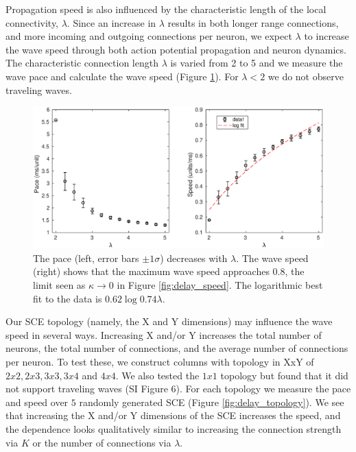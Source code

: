 Propagation speed is also influenced by the characteristic length of the local connectivity, $\lambda$.
Since an increase in $\lambda$ results in both longer range connections, and more incoming and outgoing connections per neuron, we expect $\lambda$ to increase the wave speed through both action potential propagation and neuron dynamics.
The characteristic connection length $\lambda$ is varied from 2 to 5 and we measure the wave pace and calculate the wave speed (Figure \ref{fig:delay_lambda}).
For $\lambda<2$  we do not observe traveling waves.
\begin{figure}[!htb]
 \centering
   \includegraphics[width=\textwidth]{fig/WaveSpeed_Lambda}
   \caption{ The pace (left, error bars $\pm 1 \sigma$) decreases with $\lambda$. 
           The wave speed (right) shows that the maximum wave speed approaches $0.8$, the limit seen as $\kappa \rightarrow 0$ in Figure \ref{fig:delay_speed}. 
           The logarithmic best fit to the data is $0.62\log{0.74\lambda}$.}
   \label{fig:delay_lambda}
\end{figure}

\FloatBarrier

Our SCE topology (namely, the X and Y dimensions) may influence the wave speed in several ways.
Increasing X and/or Y increases the total number of neurons, the total number of connections, and the average number of connections per neuron.
To test these, we construct columns with topology in XxY of $2x2, 2x3, 3x3, 3x4$ and $4x4$.
We also tested the $1x1$ topology but found that it did not support traveling waves (SI Figure 6).
For each topology we measure the pace and speed over $5$ randomly generated SCE (Figure \ref{fig:delay_topology}).
We see that increasing the X and/or Y dimensions of the SCE increases the speed, and the dependence looks qualitatively similar to increasing the connection strength via $K$ or the number of connections via $\lambda$.

